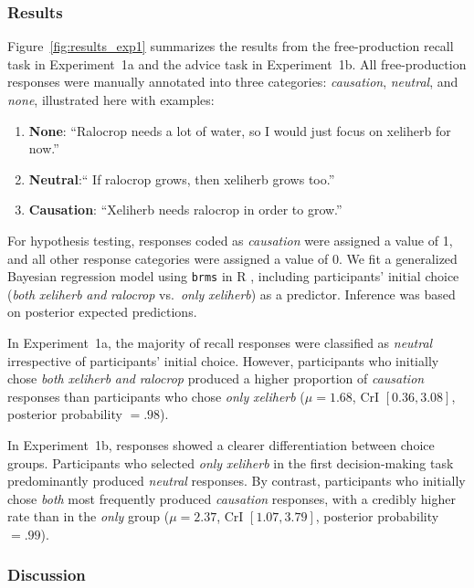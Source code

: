 \documentclass[10pt,letterpaper]{article}
\begin{document}
\subsubsection{Results}

Figure~\ref{fig:results_exp1} summarizes the results from the free-production recall task in Experiment~1a and the advice task in Experiment~1b. All free-production responses were manually annotated into three categories: \textit{causation}, \textit{neutral}, and \textit{none}, illustrated here with examples:

\begin{enumerate}
\item \textbf{None}: ``Ralocrop needs a lot of water, so I would just focus on xeliherb for now.''     
\item \textbf{Neutral}:`` If ralocrop grows, then xeliherb grows too.''
\item \textbf{Causation}: ``Xeliherb needs ralocrop in order to grow.''
\end{enumerate}

For hypothesis testing, responses coded as \textit{causation} were assigned a value of 1, and all other response categories were assigned a value of 0. We fit a generalized Bayesian regression model using \texttt{brms} \citep{brms} in \textsf{R} \citep{R-core}, including participants’ initial choice (\emph{both} \textit{xeliherb} \textit{and} \textit{ralocrop} vs.\ \emph{only} \textit{xeliherb}) as a predictor. Inference was based on posterior expected predictions.

In Experiment~1a, the majority of recall responses were classified as \textit{neutral} irrespective of participants’ initial choice. However, participants who initially chose \emph{both} \textit{xeliherb} \textit{and} \textit{ralocrop} produced a higher proportion of \textit{causation} responses than participants who chose \emph{only} \textit{xeliherb} ($\mu = 1.68$, CrI $[0.36, 3.08]$, posterior probability $= .98$).

In Experiment~1b, responses showed a clearer differentiation between choice groups. Participants who selected \emph{only} \textit{xeliherb} in the first decision-making task predominantly produced \textit{neutral} responses. By contrast, participants  who initially chose \emph{both} most frequently produced \textit{causation} responses, with a credibly higher rate than in the \emph{only} group ($\mu = 2.37$, CrI $[1.07, 3.79]$, posterior probability $= .99$).

\subsubsection{Discussion}
\end{document}
